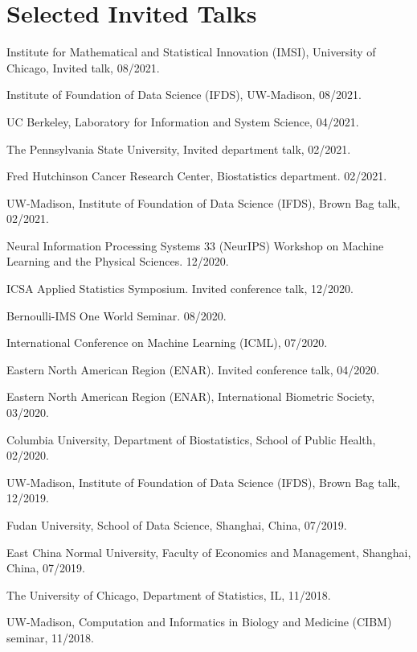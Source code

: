 \documentclass[letterpaper]{article}
\renewenvironment{itemize}{
  \begin{list}{}{
    \setlength{\leftmargin}{1.5em}
  }
}{
  \end{list}
}
\begin{document}
\section*{Selected Invited Talks}

\begin{itemize}
\item Institute for Mathematical and Statistical Innovation (IMSI), University of Chicago, Invited talk, 08/2021.
\item Institute of Foundation of Data Science (IFDS), UW-Madison, 08/2021.
\item UC Berkeley, Laboratory for Information and System Science, 04/2021.
\item The Pennsylvania State University, Invited department talk, 02/2021.
\item Fred Hutchinson Cancer Research Center, Biostatistics department. 02/2021. 
\item UW-Madison, Institute of Foundation of Data Science (IFDS), Brown Bag talk, 02/2021.
\item  Neural Information Processing Systems 33 (NeurIPS) Workshop on Machine Learning and the Physical Sciences. 12/2020.
\item ICSA Applied Statistics Symposium. Invited conference talk, 12/2020.
\item Bernoulli-IMS One World Seminar. 08/2020.
\item International Conference on Machine Learning (ICML), 07/2020.
\item  Eastern North American Region (ENAR).  Invited conference talk, 04/2020.
\item Eastern North American Region (ENAR), International Biometric Society, 03/2020.
\item Columbia University, Department of Biostatistics, School of Public Health, 02/2020. 
\item UW-Madison, Institute of Foundation of Data Science (IFDS), Brown Bag talk, 12/2019.
\item Fudan University, School of Data Science, Shanghai, China, 07/2019.
\item East China Normal University, Faculty of Economics and Management, Shanghai, China, 07/2019.
\item The University of Chicago, Department of Statistics, IL, 11/2018.
\item UW-Madison, Computation and Informatics in Biology and Medicine (CIBM) seminar, 11/2018.

\end{itemize}
\end{document}
